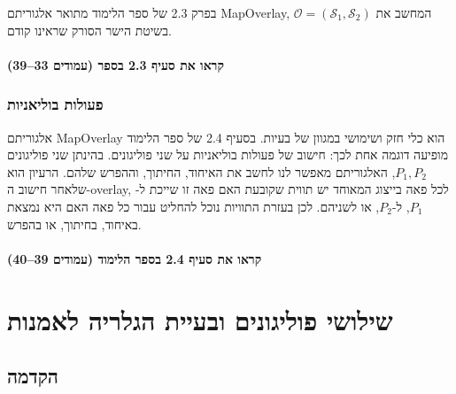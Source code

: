\documentclass[
]{book}
\begin{document}
בפרק 2.3 של ספר הלימוד מתואר אלגוריתם MapOverlay, המחשב את
\(\mathcal{O}=(\mathcal{S_1},\mathcal{S_2})\) בשיטת הישר הסורק שראינו
קודם.

\hypertarget{ux5e7ux5e8ux5d0ux5d5-ux5d0ux5ea-ux5e1ux5e2ux5d9ux5e3-2.3-ux5d1ux5e1ux5e4ux5e8-ux5e2ux5deux5d5ux5d3ux5d9ux5dd-3339}{%
\subsubsection*{קראו את סעיף 2.3 בספר (עמודים 33--39)}\label{ux5e7ux5e8ux5d0ux5d5-ux5d0ux5ea-ux5e1ux5e2ux5d9ux5e3-2.3-ux5d1ux5e1ux5e4ux5e8-ux5e2ux5deux5d5ux5d3ux5d9ux5dd-3339}}

\hypertarget{bool-op}{%
\subsection{פעולות בוליאניות}\label{bool-op}}

אלגוריתם MapOverlay הוא כלי חזק ושימושי במגוון של בעיות. בסעיף 2.4 של
ספר הלימוד מופיעה דוגמה אחת לכך: חישוב של פעולות בוליאניות על שני
פוליגונים. בהינתן שני פוליגונים \(P_1,P_2\), האלגוריתם מאפשר לנו לחשב את
האיחוד, החיתוך, וההפרש שלהם. הרעיון הוא שלאחר חישוב ה-overlay, לכל פאה
בייצוג המאוחד יש תווית שקובעת האם פאה זו שייכת ל-\(P_1\), ל-\(P_2\), או
לשניהם. לכן בעזרת התוויות נוכל להחליט עבור כל פאה האם היא נמצאת באיחוד,
בחיתוך, או בהפרש.

\hypertarget{ux5e7ux5e8ux5d0ux5d5-ux5d0ux5ea-ux5e1ux5e2ux5d9ux5e3-2.4-ux5d1ux5e1ux5e4ux5e8-ux5d4ux5dcux5d9ux5deux5d5ux5d3-ux5e2ux5deux5d5ux5d3ux5d9ux5dd-3940}{%
\subsubsection*{קראו את סעיף 2.4 בספר הלימוד (עמודים 39--40)}\label{ux5e7ux5e8ux5d0ux5d5-ux5d0ux5ea-ux5e1ux5e2ux5d9ux5e3-2.4-ux5d1ux5e1ux5e4ux5e8-ux5d4ux5dcux5d9ux5deux5d5ux5d3-ux5e2ux5deux5d5ux5d3ux5d9ux5dd-3940}}

\hypertarget{pol-tringle}{%
\chapter{שילושי פוליגונים ובעיית הגלריה לאמנות}\label{pol-tringle}}

\hypertarget{preface}{%
\section{הקדמה}\label{preface}}
\end{document}
